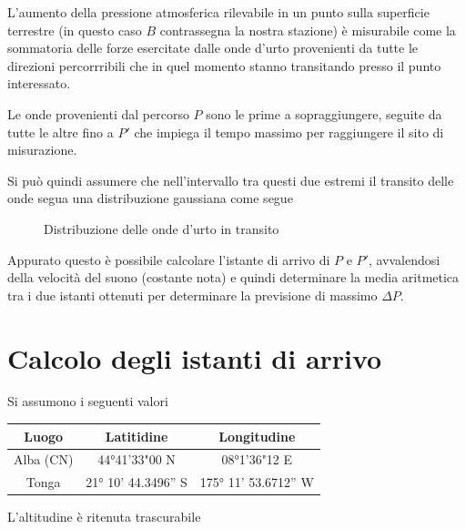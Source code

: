 \documentclass[12pt, a4paper]{article}
\begin{document}
L'aumento della pressione atmosferica rilevabile in un punto sulla superficie terrestre (in questo caso $B$ contrassegna la nostra stazione) è misurabile come la sommatoria delle forze esercitate dalle onde d'urto provenienti da tutte le direzioni percorrribili che in quel momento stanno transitando presso il punto interessato.

Le onde provenienti dal percorso $P$ sono le prime a sopraggiungere, seguite da tutte le altre fino a $P'$ che impiega il tempo massimo per raggiungere il sito di misurazione.

Si può quindi assumere che nell'intervallo tra questi due estremi il transito delle onde segua una distribuzione gaussiana come segue



\begin{figure}[H]
	\centering
{}
	\caption{Distribuzione delle onde d'urto in transito}
\end{figure}

Appurato questo è possibile calcolare l'istante di arrivo di $P$ e $P'$, avvalendosi della velocità del suono (costante nota) e quindi determinare la media aritmetica tra i due istanti ottenuti per determinare la previsione di massimo $\Delta P$.

\section{Calcolo degli istanti di arrivo}
Si assumono i seguenti valori
\begin{center}
\begin{tabular}{|c|c|c|}
	\hline
	Luogo & Latitidine & Longitudine \\
	\hline
	\hline
	Alba (CN) & 44°41'33"00 N & 08°1'36"12 E \\
	\hline
	Tonga & 21° 10' 44.3496'' S & 175° 11' 53.6712'' W \\
	\hline
\end{tabular}
\end{center}
L'altitudine è ritenuta trascurabile
\end{document}
